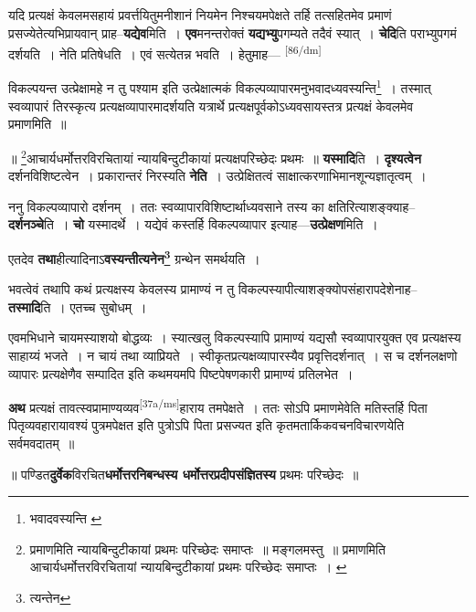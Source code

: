 \documentclass[article,12pt,a4paper]{memoir}
\begin{document}
	  \pstart यदि प्रत्यक्षं केवलमसहायं प्रवर्त्तयितुमनीशानं नियमेन निश्चयमपेक्षते तर्हि तत्सहितमेव प्रमाणं प्रसज्येतेत्यभिप्रायवान् प्राह--\textbf{यद्येव}मिति । \textbf{एव}मनन्तरोक्तं \textbf{यद्यभ्यु}पगम्यते तदैवं स्यात् । \textbf{चेदि}ति पराभ्युपगमं दर्शयति । नेति प्रतिषेधति । एवं सत्येतन्न भवति । हेतुमाह—  \leavevmode\textsuperscript{\rmlatinfont\tiny [86/dm]} 
	  
	विकल्पयन्त उत्प्रेक्षामहे न तु पश्याम इति उत्प्रेक्षात्मकं विकल्पव्यापारमनुभवादध्यवस्यन्ति\footnote{भवादवस्यन्ति \cite{dp-msA} \cite{dp-msC} \cite{dp-edP} \cite{dp-edH} \cite{dp-edE} \cite{dp-edN}} । तस्मात् स्वव्यापारं तिरस्कृत्य प्रत्यक्षव्यापारमादर्शयति यत्रार्थे प्रत्यक्षपूर्वकोऽध्यवसायस्तत्र प्रत्यक्षं केवलमेव प्रमाणमिति ॥ 
	  
	॥ \footnote{प्रमाणमिति न्यायबिन्दुटीकायां प्रथमः परिच्छेदः समाप्तः ॥ मङ्गलमस्तु ॥ \cite{dp-msA} प्रमाणमिति आचार्यधर्मोत्तरविरचितायां न्यायबिन्दुटीकायां प्रथमः परिच्छेदः समाप्तः । \cite{dp-msC}}आचार्यधर्मोत्तरविरचितायां न्यायबिन्दुटीकायां प्रत्यक्षपरिच्छेदः प्रथमः ॥ \textbf{यस्मादि}ति । \textbf{दृश्यत्वेन} दर्शनविशिष्टत्वेन । प्रकारान्तरं निरस्यति \textbf{नेति} । उत्प्रेक्षितत्वं साक्षात्करणाभिमानशून्यज्ञातृत्वम् ।
	\pend
      

	  \pstart ननु विकल्पव्यापारो दर्शनम् । ततः स्वव्यापारविशिष्टार्थाध्यवसाने तस्य का क्षतिरित्याशङ्क्याह--\textbf{दर्शनञ्चे}ति । \textbf{चो} यस्मादर्थे । यद्येवं कस्तर्हि विकल्पव्यापार इत्याह—\textbf{उत्प्रेक्षण}मिति ।
	\pend
      

	  \pstart एतदेव \textbf{तथा}हीत्यादिनाऽ\textbf{वस्यन्तीत्यनेन\footnote{त्यन्तेन}} ग्रन्थेन समर्थयति ।
	\pend
      

	  \pstart भवत्वेवं तथापि कथं प्रत्यक्षस्य केवलस्य प्रामाण्यं न तु विकल्पस्यापीत्याशङ्क्योपसंहारापदेशेनाह--\textbf{तस्मादि}ति । एतच्च सुबोधम् ।
	\pend
      

	  \pstart एवमभिधाने चायमस्याशयो बोद्धव्यः । स्यात्खलु विकल्पस्यापि प्रामाण्यं यद्यसौ स्वव्यापारयुक्त एव प्रत्यक्षस्य साहाय्यं भजते । न चायं तथा व्याप्रियते । स्वीकृतप्रत्यक्षव्यापारस्यैव प्रवृत्तिदर्शनात् । स च दर्शनलक्षणो व्यापारः प्रत्यक्षेणैव सम्पादित इति कथमयमपि पिष्टपेषणकारी प्रामाण्यं प्रतिलभेत ।
	\pend
      

	  \pstart \textbf{अथ} प्रत्यक्षं तावत्स्वप्रामाण्यव्यव\leavevmode\textsuperscript{\rmlatinfont\tiny [37a/ms]}हाराय तमपेक्षते । ततः सोऽपि प्रमाणमेवेति मतिस्तर्हि पिता पितृव्यवहारायावश्यं पुत्रमपेक्षत इति पुत्रोऽपि पिता प्रसज्यत इति कृतमतार्किकवचनविचारणयेति सर्वमवदातम् ॥
	\pend
      

	  \pstart ॥ पण्डित\textbf{दुर्वेक}विरचित\textbf{धर्मोत्तरनिबन्धस्य धर्मोत्तरप्रदीपसंज्ञितस्य} प्रथमः परिच्छेदः ॥
	\pend
      
\end{document}

